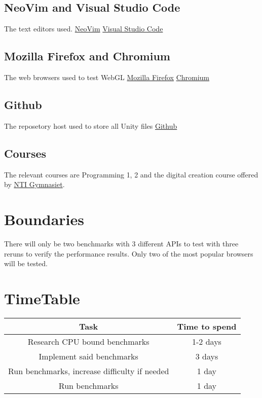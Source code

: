 \documentclass{article}
\begin{document}
\subsection* {NeoVim and Visual Studio Code}
The text editors used.
\newline\href{https://neovim.io/}{NeoVim}
\newline\href{https://code.visualstudio.com/}{Visual Studio Code}

\subsection* {Mozilla Firefox and Chromium}
The web browsers used to test WebGL
\newline\href{https://www.mozilla.org/en-US/firefox/new/}{Mozilla Firefox}
\newline\href{https://code.visualstudio.com/}{Chromium}


\subsection* {Github}
The reposetory host used to store all Unity files
\newline\href{https://github.com}{Github}

\subsection* {Courses}
The relevant courses are Programming 1, 2 and the digital creation course offered by \href{https://www.ntigymnasiet.se/}{NTI Gymnasiet}.


\section {Boundaries}
There will only be two benchmarks with 3 different APIs to test with three reruns to verify the performance results. Only two of the most popular browsers will be tested.

\section {TimeTable}
\begin{center}
\begin{tabular}{ |c|c| }
\hline
\textbf {Task} & \textbf {Time to spend} \\
\hline
Research CPU bound benchmarks & 1-2 days \\
\hline
Implement said benchmarks & 3 days \\
\hline
Run benchmarks, increase difficulty if needed & 1 day \\
\hline
Run benchmarks & 1 day \\
\hline
\end{tabular}
\end{center}
\end{document}
